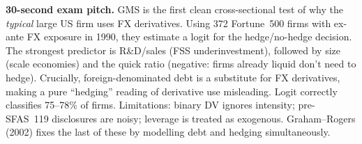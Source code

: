 \documentclass[11pt]{article}
\begin{document}
\begin{keybox}
\textbf{30-second exam pitch.} GMS is the first clean cross-sectional test of why the \emph{typical} large US firm uses FX derivatives. Using 372 Fortune~500 firms with ex-ante FX exposure in 1990, they estimate a logit for the hedge/no-hedge decision. The strongest predictor is R\&D/sales (FSS underinvestment), followed by size (scale economies) and the quick ratio (negative: firms already liquid don't need to hedge). Crucially, foreign-denominated debt is a substitute for FX derivatives, making a pure ``hedging'' reading of derivative use misleading. Logit correctly classifies 75--78\% of firms. Limitations: binary DV ignores intensity; pre-SFAS~119 disclosures are noisy; leverage is treated as exogenous. Graham--Rogers (2002) fixes the last of these by modelling debt and hedging simultaneously.
\end{keybox}
\end{document}
